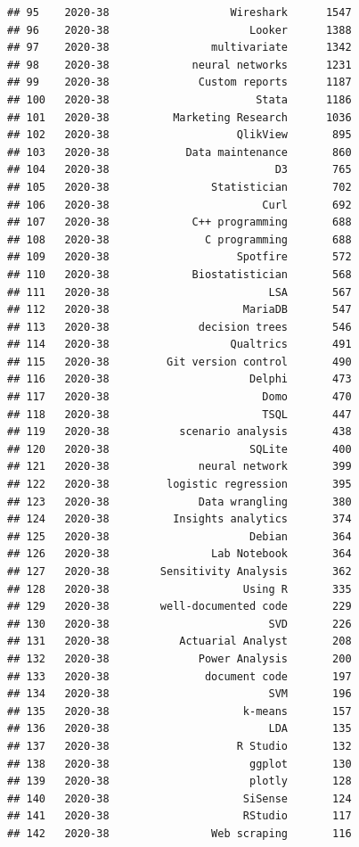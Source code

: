 \documentclass[
]{article}
\begin{document}
\begin{verbatim}
## 95    2020-38                   Wireshark      1547
## 96    2020-38                      Looker      1388
## 97    2020-38                multivariate      1342
## 98    2020-38             neural networks      1231
## 99    2020-38              Custom reports      1187
## 100   2020-38                       Stata      1186
## 101   2020-38          Marketing Research      1036
## 102   2020-38                    QlikView       895
## 103   2020-38            Data maintenance       860
## 104   2020-38                          D3       765
## 105   2020-38                Statistician       702
## 106   2020-38                        Curl       692
## 107   2020-38             C++ programming       688
## 108   2020-38               C programming       688
## 109   2020-38                    Spotfire       572
## 110   2020-38             Biostatistician       568
## 111   2020-38                         LSA       567
## 112   2020-38                     MariaDB       547
## 113   2020-38              decision trees       546
## 114   2020-38                   Qualtrics       491
## 115   2020-38         Git version control       490
## 116   2020-38                      Delphi       473
## 117   2020-38                        Domo       470
## 118   2020-38                        TSQL       447
## 119   2020-38           scenario analysis       438
## 120   2020-38                      SQLite       400
## 121   2020-38              neural network       399
## 122   2020-38         logistic regression       395
## 123   2020-38              Data wrangling       380
## 124   2020-38          Insights analytics       374
## 125   2020-38                      Debian       364
## 126   2020-38                Lab Notebook       364
## 127   2020-38        Sensitivity Analysis       362
## 128   2020-38                     Using R       335
## 129   2020-38        well-documented code       229
## 130   2020-38                         SVD       226
## 131   2020-38           Actuarial Analyst       208
## 132   2020-38              Power Analysis       200
## 133   2020-38               document code       197
## 134   2020-38                         SVM       196
## 135   2020-38                     k-means       157
## 136   2020-38                         LDA       135
## 137   2020-38                    R Studio       132
## 138   2020-38                      ggplot       130
## 139   2020-38                      plotly       128
## 140   2020-38                     SiSense       124
## 141   2020-38                     RStudio       117
## 142   2020-38                Web scraping       116

\end{verbatim}
\end{document}
